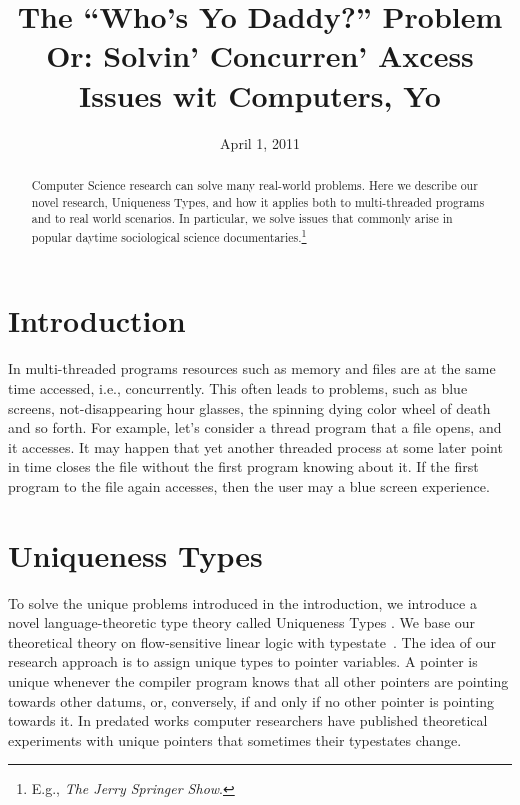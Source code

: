 \documentclass[nocopyrightspace,10pt]{sigplanconf}
\begin{document}
\title{The ``Who's Yo Daddy?'' Problem \\ \Large{Or: Solvin' Concurren' Axcess Issues wit Computers, Yo}}

\date{April 1, 2011}

\nocaptionrule

\maketitle

\pagestyle{empty}
\thispagestyle{empty}

\begin{abstract}
Computer Science research can solve many real-world problems. Here we describe our novel research, Uniqueness Types, and how it applies both to multi-threaded programs and to real world scenarios. In particular, we solve issues that commonly arise in popular daytime sociological science documentaries.\footnote{E.g., \emph{The Jerry Springer Show}.}
\end{abstract}

\section{Introduction}
In multi-threaded programs resources such as memory and files are at the same time accessed, i.e., concurrently. This often leads to problems, such as blue screens, not-disappearing hour glasses, the spinning dying color wheel of death and so forth. For example, let's consider a thread program that a file opens, and it accesses. It may happen that yet another threaded process at some later point in time closes the file without the first program knowing about it. If the first program to the file again accesses, then the user may a blue screen experience.

\section{Uniqueness Types}
To solve the unique problems introduced in the introduction, we introduce a novel language-theoretic type theory called Uniqueness Types \cite{philipp}. We base our theoretical theory on flow-sensitive linear logic with typestate~\cite{kevin}. The idea of our research approach is to assign unique types to pointer variables. A pointer is unique whenever the compiler program knows that all other pointers are pointing towards other datums, or, conversely, if and only if no other pointer is pointing towards it. In predated works computer researchers have published theoretical experiments with unique pointers that sometimes their typestates change.
\end{document}
